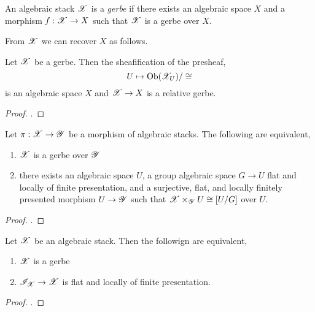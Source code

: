 \documentclass[12pt]{article}
\begin{document}
\begin{defn}
An algebraic stack $\mathscr{X}$ is a \textit{gerbe} if there exists an algebraic space $X$ and a morphism $f : \mathscr{X} \to X$ such that $\mathscr{X}$ is a gerbe over $X$.
\end{defn}

\begin{rmk}
From $\mathscr{X}$ we can recover $X$ as follows.
\end{rmk}

\begin{lemma}
Let $\mathscr{X}$ be a gerbe. Then the sheafification of the presheaf,
\[ U \mapsto \mathrm{Ob}(\mathscr{X}_U)/\cong \]
is an algebraic space $X$ and $\mathscr{X} \to X$ is a relative gerbe.
\end{lemma}

\begin{proof}
.
\end{proof}


\begin{prop}
Let $\pi : \mathscr{X} \to \mathscr{Y}$ be a morphism of algebraic stacks. The following are equivalent,
\begin{enumerate}
\item $\mathscr{X}$ is a gerbe over $\mathscr{Y}$
\item there exists an algebraic space $U$, a group algebraic space $G \to U$ flat and locally of finite presentation, and a surjective, flat, and locally finitely presented morphism $U \to \mathscr{Y}$ such that $\mathscr{X} \times_{\mathscr{Y}} U \cong [U / G]$ over $U$.
\end{enumerate}
\end{prop}

\begin{proof}
. 
\end{proof}

\begin{prop}
Let $\mathscr{X}$ be an algebraic stack. Then the followign are equivalent,
\begin{enumerate}
\item $\mathscr{X}$ is a gerbe
\item $\mathscr{I}_{\mathscr{X}} \to \mathscr{X}$ is flat and locally of finite presentation.
\end{enumerate}
\end{prop}

\begin{proof}
.
\end{proof}
\end{document}
